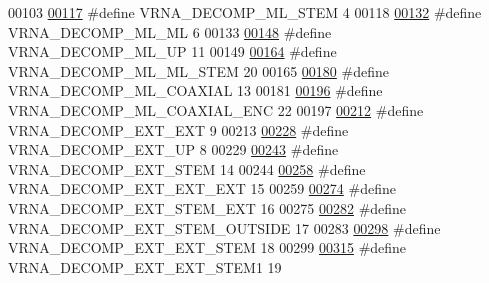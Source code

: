 \begin{DoxyCode}
00103 
\hypertarget{constraints_8h_source.tex_l00117}{}\hyperlink{group__constraints_ga4a23054c75d8efc785de50e3ea87602f}{00117} \textcolor{preprocessor}{#define VRNA\_DECOMP\_ML\_STEM     4}
00118 
\hypertarget{constraints_8h_source.tex_l00132}{}\hyperlink{group__constraints_ga7f4cb9ff7a33e67f0539bd39e7b19a78}{00132} \textcolor{preprocessor}{#define VRNA\_DECOMP\_ML\_ML       6}
00133 
\hypertarget{constraints_8h_source.tex_l00148}{}\hyperlink{group__constraints_gae6478dda14e50e2f2cb9ef333a29256e}{00148} \textcolor{preprocessor}{#define VRNA\_DECOMP\_ML\_UP       11}
00149 
\hypertarget{constraints_8h_source.tex_l00164}{}\hyperlink{group__constraints_ga63d8ceb8c96ae3b463e529e28cc0fe98}{00164} \textcolor{preprocessor}{#define VRNA\_DECOMP\_ML\_ML\_STEM 20}
00165 
\hypertarget{constraints_8h_source.tex_l00180}{}\hyperlink{group__constraints_ga4fe48d575830b16c208e280e01ab1497}{00180} \textcolor{preprocessor}{#define VRNA\_DECOMP\_ML\_COAXIAL  13}
00181 
\hypertarget{constraints_8h_source.tex_l00196}{}\hyperlink{group__constraints_ga0224727f7b8ad2f23eb0a3fd28d8b3fb}{00196} \textcolor{preprocessor}{#define VRNA\_DECOMP\_ML\_COAXIAL\_ENC  22}
00197 
\hypertarget{constraints_8h_source.tex_l00212}{}\hyperlink{group__constraints_ga437adf5115c1999304eff26b41e4c9b6}{00212} \textcolor{preprocessor}{#define VRNA\_DECOMP\_EXT\_EXT     9}
00213 
\hypertarget{constraints_8h_source.tex_l00228}{}\hyperlink{group__constraints_gaff1ddaffe86d984623910b40cc8a8717}{00228} \textcolor{preprocessor}{#define VRNA\_DECOMP\_EXT\_UP      8}
00229 
\hypertarget{constraints_8h_source.tex_l00243}{}\hyperlink{group__constraints_gae44b5ace0d9b4a29088069ecb4cec441}{00243} \textcolor{preprocessor}{#define VRNA\_DECOMP\_EXT\_STEM 14}
00244 
\hypertarget{constraints_8h_source.tex_l00258}{}\hyperlink{group__constraints_ga803bd818b3f4b2b0a4a5cfa2f7dc2045}{00258} \textcolor{preprocessor}{#define VRNA\_DECOMP\_EXT\_EXT\_EXT 15}
00259 
\hypertarget{constraints_8h_source.tex_l00274}{}\hyperlink{group__constraints_gabb09c5b78b75a44502fc77b950125c1e}{00274} \textcolor{preprocessor}{#define VRNA\_DECOMP\_EXT\_STEM\_EXT 16}
00275 
\hypertarget{constraints_8h_source.tex_l00282}{}\hyperlink{group__constraints_gae7554cd3ff089360c02e4920229e221c}{00282} \textcolor{preprocessor}{#define VRNA\_DECOMP\_EXT\_STEM\_OUTSIDE 17}
00283 
\hypertarget{constraints_8h_source.tex_l00298}{}\hyperlink{group__constraints_ga06efd054c9271438f6d82d4559d9e69f}{00298} \textcolor{preprocessor}{#define VRNA\_DECOMP\_EXT\_EXT\_STEM 18}
00299 
\hypertarget{constraints_8h_source.tex_l00315}{}\hyperlink{group__constraints_ga2e75d7a77118735b32f25422d9686719}{00315} \textcolor{preprocessor}{#define VRNA\_DECOMP\_EXT\_EXT\_STEM1 19}

\end{DoxyCode}
